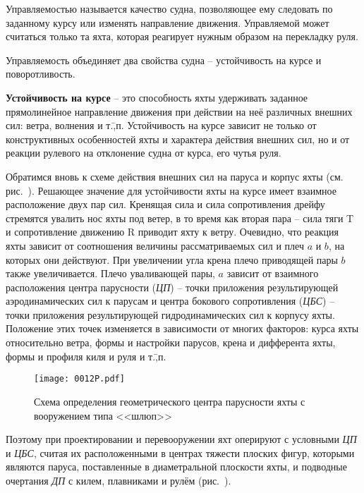 Управляемостью называется качество судна, позволяющее ему следовать по
заданному курсу или изменять направление движения. Управляемой может
считаться только та яхта, которая реагирует нужным образом на
перекладку руля.

Управляемость объединяет два свойства судна \--- устойчивость на курсе
и поворотливость.

\textbf{Устойчивость на курсе} \--- это
способность яхты удерживать заданное прямолинейное направление
движения при действии на неё различных внешних сил: ветра, волнения и
т.\=,п. Устойчивость на курсе зависит не только от конструктивных
особенностей яхты и характера действия внешних сил, но и от реакции
рулевого на отклонение судна от курса, его чутья руля.

Обратимся вновь к схеме действия внешних сил на паруса и корпус яхты
(см. рис.~). Решающее значение для устойчивости яхты на курсе
имеет взаимное расположение двух пар сил. Кренящая сила
 и сила сопротивления дрейфу
 стремятся увалить нос
яхты под ветер, в то время как вторая пара \--- сила тяги \ve
T и сопротивление движению \ve
R приводит яхту к ветру. Очевидно,
что реакция яхты зависит от соотношения величины рассматриваемых сил и
плеч $a$ и $b$, на которых они действуют. При увеличении угла крена
плечо приводящей пары $b$ также увеличивается. Плечо уваливающей пары,
$a$ зависит от взаимного расположения центра парусности (\textit{ЦП})
\--- точки приложения результирующей аэродинамических сил к парусам и
центра бокового сопротивления (\textit{ЦБС}) \--- точки приложения
результирующей гидродинамических сил к корпусу яхты. Положение этих
точек изменяется в зависимости от многих факторов: курса яхты
относительно ветра, формы и настройки парусов, крена и дифферента
яхты, формы и профиля киля и руля и т.\=,п.

\begin{figure}[htb]
  \centering
  \texttt{[image: 0012P.pdf]}
  \caption{Схема определения геометрического центра парусности яхты с вооружением типа <<шлюп>>}
  \label{fig:12}
\end{figure}

Поэтому при проектировании и перевооружении яхт оперируют с условными
\textit{ЦП} и \textit{ЦБС}, считая их расположенными в центрах тяжести
плоских фигур, которыми являются паруса, поставленные в диаметральной
плоскости яхты, и подводные очертания \textit{ДП} с килем, плавниками
и рулём (рис.~).

